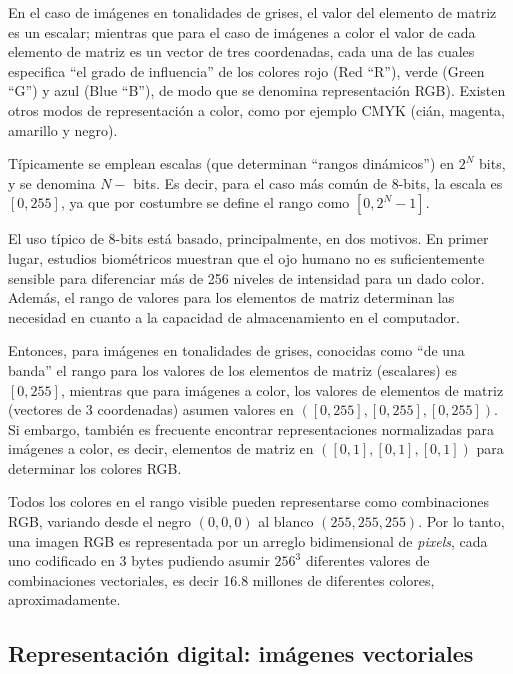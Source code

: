 %
En el caso de im\'agenes en tonalidades de grises, el valor del elemento de matriz es un escalar; mientras que para el caso de im\'agenes a color el
valor de cada elemento de matriz es un vector de tres coordenadas, cada una de las cuales especifica ``el grado de influencia'' de los colores rojo
(Red ``R''), verde (Green ``G'') y azul (Blue ``B''), de modo que se denomina representaci\'on RGB).
%
Existen otros modos de representaci\'on a color, como por ejemplo CMYK (ci\'an, magenta, amarillo y negro).
%

%
T\'ipicamente se emplean escalas (que determinan ``rangos din\'amicos'') en $2^{N}$ bits, y se denomina $N-$ bits. Es decir, para el caso m\'as com\'un de
8-bits, la escala es $[0, 255]$, ya que por costumbre se define el rango como $[0, 2^{N} - 1]$.
%

%
El uso t\'ipico de 8-bits est\'a basado, principalmente, en dos motivos. En primer lugar, estudios biom\'etricos muestran que el ojo humano no
es suficientemente sensible para diferenciar m\'as de 256 niveles de intensidad para un dado color. Adem\'as, el rango de valores para los
elementos de matriz determinan las necesidad en cuanto a la capacidad de almacenamiento en el computador.
%

%
Entonces, para im\'agenes en tonalidades de grises, conocidas
como ``de una banda'' el rango para los valores de los elementos de matriz (escalares) es $[0, 255]$, mientras que para im\'agenes a color, los valores de
elementos de matriz (vectores de 3 coordenadas) asumen valores en $([0, 255], [0, 255], [0, 255])$.
%
Si embargo, tambi\'en es frecuente encontrar representaciones
normalizadas para im\'agenes a color, es decir, elementos de matriz en $([0, 1], [0, 1], [0, 1])$ para determinar los colores RGB.
%

%
Todos los colores en el rango visible pueden representarse como combinaciones RGB, variando desde el negro $(0, 0, 0)$ al blanco $(255, 255, 255)$.
%
Por lo tanto, una imagen RGB es representada por un arreglo bidimensional de \textit{pixels}, cada uno codificado en 3 bytes pudiendo asumir
$256^{3}$ diferentes valores de combinaciones vectoriales, es decir 16.8 millones de diferentes colores, aproximadamente.
%

\subsection{Representaci\'on digital: im\'agenes vectoriales}

